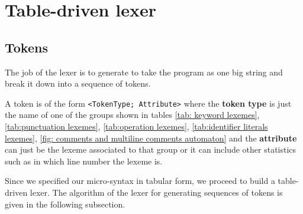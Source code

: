 \section{Table-driven lexer}
\subsection{Tokens}
The job of the lexer is to generate to take the program as one big string and break it down into a sequence of tokens.

A token is of the form \verb!<TokenType; Attribute>! where the \textbf{token type} is just the name of one of the groups shown in tables \ref{tab: keyword lexemes}, \ref{tab:punctuation lexemes}, \ref{tab:operation lexemes}, \ref{tab:identifier literals lexemes}, \ref{fig: comments and multiline comments automaton} and the \textbf{attribute} can just be the lexeme associated to that group or it can include other statistics such as in which line number the lexeme  is.

\vskip 0.2in

Since we specified our micro-syntax in tabular form, we proceed to build a table-driven lexer. The algorithm of the lexer for generating sequences of tokens is given in the following subsection.

